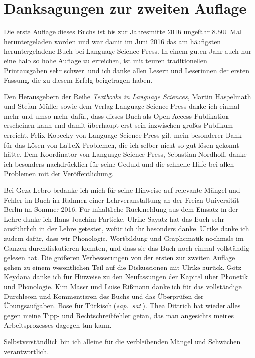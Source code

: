 \section*{Danksagungen zur zweiten Auflage}

Die erste Auflage dieses Buchs ist bis zur Jahresmitte 2016 ungefähr 8.500 Mal heruntergeladen worden und war damit im Juni 2016 das am häufigsten heruntergeladene Buch bei Language Science Press.
In einem guten Jahr auch nur eine halb so hohe Auflage zu erreichen, ist mit teuren traditionellen Printausgaben sehr schwer, und ich danke allen Lesern und Leserinnen der ersten Fassung, die zu diesem Erfolg beigetragen haben.

Den Herausgebern der Reihe \textit{Textbooks in Language Sciences}, Martin Haspelmath und Stefan Müller sowie dem Verlag Language Science Press danke ich einmal mehr und umso mehr dafür, dass dieses Buch als Open-Access-Publikation erscheinen kann und damit überhaupt erst sein inzwischen großes Publikum erreicht.
Felix Kopecky von Language Science Press gilt mein besonderer Dank für das Lösen von \LaTeX-Problemen, die ich selber nicht so gut lösen gekonnt hätte.
Dem Koordinator von Language Science Press, Sebastian Nordhoff, danke ich besonders nachdrücklich für seine Geduld und die schnelle Hilfe bei allen Problemen mit der Veröffentlichung.

Bei Geza Lebro bedanke ich mich für seine Hinweise auf relevante Mängel und Fehler im Buch im Rahmen einer Lehrveranstaltung an der Freien Universität Berlin im Sommer 2016.
Für inhaltliche Rückmeldung aus dem Einsatz in der Lehre danke ich Hans-Joachim Particke.
Ulrike Sayatz hat das Buch sehr ausführlich in der Lehre getestet, wofür ich ihr besonders danke.
Ulrike danke ich zudem dafür, dass wir Phonologie, Wortbildung und Graphematik nochmals im Ganzen durchdiskutieren konnten, und dass sie das Buch noch einmal vollständig gelesen hat.
Die größeren Verbesserungen von der ersten zur zweiten Auflage gehen zu einem wesentlichen Teil auf die Diskussionen mit Ulrike zurück.
Götz Keydana danke ich für Hinweise zu den Neufassungen der Kapitel über Phonetik und Phonologie.
Kim Maser und Luise Rißmann danke ich für das vollständige Durchlesen und Kommentieren des Buchs und das Überprüfen der Übungsaufgaben.
Bose für Türkisch (\textit{sap.\ sat.}).
Thea Dittrich hat wieder alles gegen meine Tipp- und Rechtschreibfehler getan, das man angesichts meines Arbeitsprozesses dagegen tun kann.

Selbstverständlich bin ich alleine für die verbleibenden Mängel und Schwächen verantwortlich.

